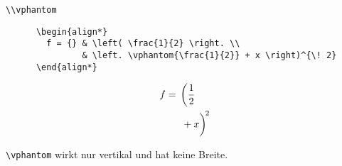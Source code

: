 \begin{frame}[fragile]{\lstinline+\\vphantom+}
  \begin{CodeExample}{0.70}
    \begin{lstlisting}
      \begin{align*}
        f = {} & \left( \frac{1}{2} \right. \\
               & \left. \vphantom{\frac{1}{2}} + x \right)^{\! 2}
      \end{align*}
    \end{lstlisting}
  \CodeResult
    \begin{align*}
      f = {} & \left( \frac{1}{2} \right. \\
             & \left. \vphantom{\frac{1}{2}} + x \right)^{\! 2}
    \end{align*}
  \end{CodeExample}
  \vspace{5pt}
  \lstinline+\vphantom+ wirkt nur vertikal und hat keine Breite.
\end{frame}

